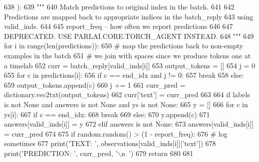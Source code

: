 \begin{DoxyCode}
638     ):
639         \textcolor{stringliteral}{"""}
640 \textcolor{stringliteral}{        Match predictions to original index in the batch.}
641 \textcolor{stringliteral}{}
642 \textcolor{stringliteral}{        Predictions are mapped back to appropriate indices in the batch\_reply}
643 \textcolor{stringliteral}{        using valid\_inds.}
644 \textcolor{stringliteral}{}
645 \textcolor{stringliteral}{        report\_freq -- how often we report predictions}
646 \textcolor{stringliteral}{}
647 \textcolor{stringliteral}{        DEPRECATED. USE PARLAI.CORE.TORCH\_AGENT INSTEAD.}
648 \textcolor{stringliteral}{        """}
649         \textcolor{keywordflow}{for} i \textcolor{keywordflow}{in} range(len(predictions)):
650             \textcolor{comment}{# map the predictions back to non-empty examples in the batch}
651             \textcolor{comment}{# we join with spaces since we produce tokens one at a timelab}
652             curr = batch\_reply[valid\_inds[i]]
653             output\_tokens = []
654             j = 0
655             \textcolor{keywordflow}{for} c \textcolor{keywordflow}{in} predictions[i]:
656                 \textcolor{keywordflow}{if} c == end\_idx \textcolor{keywordflow}{and} j != 0:
657                     \textcolor{keywordflow}{break}
658                 \textcolor{keywordflow}{else}:
659                     output\_tokens.append(c)
660                 j += 1
661             curr\_pred = dictionary.vec2txt(output\_tokens)
662             curr[\textcolor{stringliteral}{'text'}] = curr\_pred
663 
664             \textcolor{keywordflow}{if} labels \textcolor{keywordflow}{is} \textcolor{keywordflow}{not} \textcolor{keywordtype}{None} \textcolor{keywordflow}{and} answers \textcolor{keywordflow}{is} \textcolor{keywordflow}{not} \textcolor{keywordtype}{None} \textcolor{keywordflow}{and} ys \textcolor{keywordflow}{is} \textcolor{keywordflow}{not} \textcolor{keywordtype}{None}:
665                 y = []
666                 \textcolor{keywordflow}{for} c \textcolor{keywordflow}{in} ys[i]:
667                     \textcolor{keywordflow}{if} c == end\_idx:
668                         \textcolor{keywordflow}{break}
669                     \textcolor{keywordflow}{else}:
670                         y.append(c)
671                 answers[valid\_inds[i]] = y
672             \textcolor{keywordflow}{elif} answers \textcolor{keywordflow}{is} \textcolor{keywordflow}{not} \textcolor{keywordtype}{None}:
673                 answers[valid\_inds[i]] = curr\_pred
674 
675             \textcolor{keywordflow}{if} random.random() > (1 - report\_freq):
676                 \textcolor{comment}{# log sometimes}
677                 print(\textcolor{stringliteral}{'TEXT: '}, observations[valid\_inds[i]][\textcolor{stringliteral}{'text'}])
678                 print(\textcolor{stringliteral}{'PREDICTION: '}, curr\_pred, \textcolor{stringliteral}{'\(\backslash\)n~'})
679         \textcolor{keywordflow}{return}
680 
681 
\end{DoxyCode}
